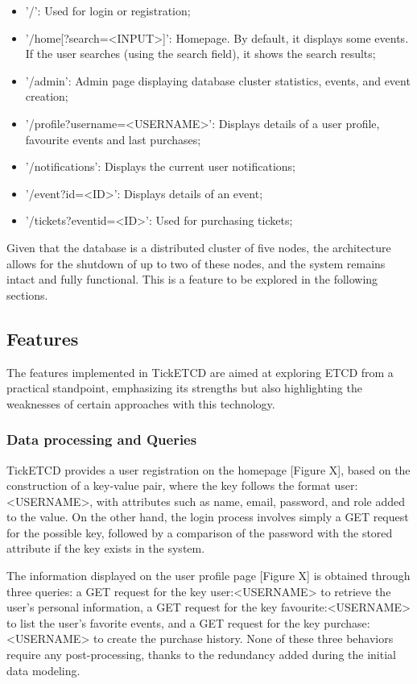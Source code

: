\documentclass[screen,review]{acmart}
\begin{document}
\begin{itemize}
    \item '/': Used for login or registration;
    \item '/home[?search=<INPUT>]': Homepage. By default, it displays some events. If the user searches (using the search field), it shows the search results;
    \item '/admin': Admin page displaying database cluster statistics, events, and event creation;
    \item '/profile?username=<USERNAME>': Displays details of a user profile, favourite events and last purchases;
    \item '/notifications': Displays the current user notifications;
    \item '/event?id=<ID>': Displays details of an event;
    \item '/tickets?eventid=<ID>': Used for purchasing tickets;
\end{itemize}

Given that the database is a distributed cluster of five nodes, the architecture allows for the shutdown of up to two of these nodes, and the system remains intact and fully functional. This is a feature to be explored in the following sections.

\subsection{Features}

The features implemented in TickETCD are aimed at exploring ETCD from a practical standpoint, emphasizing its strengths but also highlighting the weaknesses of certain approaches with this technology.

\subsubsection{Data processing and Queries}

TickETCD provides a user registration on the homepage [Figure X], based on the construction of a key-value pair, where the key follows the format user:<USERNAME>, with attributes such as name, email, password, and role added to the value. On the other hand, the login process involves simply a GET request for the possible key, followed by a comparison of the password with the stored attribute if the key exists in the system.

The information displayed on the user profile page [Figure X] is obtained through three queries: a GET request for the key user:<USERNAME> to retrieve the user's personal information, a GET request for the key favourite:<USERNAME> to list the user's favorite events, and a GET request for the key purchase:<USERNAME> to create the purchase history. None of these three behaviors require any post-processing, thanks to the redundancy added during the initial data modeling.
\end{document}
